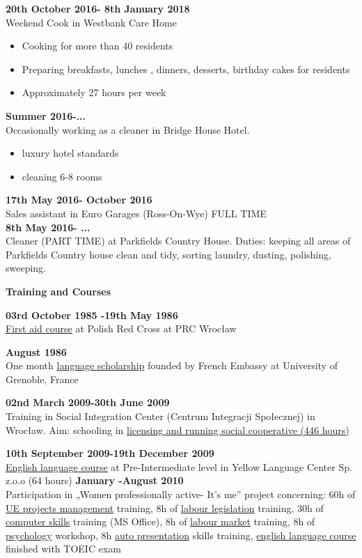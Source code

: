 \documentclass[a4paper,12pt,final]{memoir}
\newcommand{\SmallSep}{\vspace{0.5em}}
\newenvironment{Career Profile}
	{\ignorespaces\textbf{\color{ForestGreen} Career Profile}}
	{\Sep\ignorespacesafterend}
\newenvironment{Key experience}
	{\ignorespaces\textbf{\color{ForestGreen} Key experience}}
	{\Sep\ignorespacesafterend}
\newcommand{\CVSection}[1]
	{\Large\textbf{#1}\par
	\SmallSep\normalsize\normalfont}
\newcommand{\CVItem}[1]
	{\textbf{\color{ForestGreen} #1}}
\begin{document}
\CVItem{20th October 2016- 8th January 2018}\\
Weekend Cook in Westbank Care Home \\
\begin{itemize}
\item{Cooking for more than 40 residents}
\item{Preparing breakfasts, lunches , dinners, desserts, birthday cakes for residents}
\item{Approximately 27  hours per week}
\end{itemize}

\SmallSep
\clearpage
\framebreak
\framebreak

\CVItem{Summer 2016-...}\\
Occasionally working as a cleaner in Bridge House Hotel.\\
\begin{itemize}
\item{luxury hotel standards}
\item{cleaning 6-8 rooms}
\end{itemize}

\CVItem{17th May 2016- October 2016}\\
Sales assistant in Euro Garages (Ross-On-Wye) FULL TIME\\


\CVItem{8th May 2016- ...}\\
Cleaner (PART TIME) at Parkfields Country House. Duties: keeping all
areas of Parkfields Country house clean and tidy, sorting laundry, dusting,
polishing, sweeping.\\



\SmallSep

\CVSection{Training and Courses}
\CVItem{ 03rd October 1985 -19th May 1986}\\
\underline{First aid course} at Polish Red Cross at PRC Wrocław
\SmallSep

\CVItem{August 1986}\\
One month \underline{language scholarship} founded by French Embassy at University of Grenoble, France
\SmallSep

\CVItem{02nd March 2009-30th June 2009	}\\
Training in Social Integration Center (Centrum Integracji Społecznej) in 	Wrocław. Aim: schooling in \underline{licensing and running social cooperative (446 hours)}
\SmallSep

\CVItem{10th September 2009-19th December 2009}\\
\underline{English language course} at Pre-Intermediate level in Yellow Language Center 	Sp. z.o.o  (64 hours)
\SmallSep
\clearpage
\framebreak
\framebreak
\CVItem{January -August 2010 }\\
Participation in „Women professionally active- It's me” project concerning: 60h of \underline{UE projects management} training, 8h of \underline{labour legislation} training, 30h of \underline{computer skills} training (MS Office), 8h of \underline{labour market} training, 8h of \underline{psychology} workshop, 8h \underline{auto presentation} skills training,  \underline{english language course} finished with TOEIC exam
\SmallSep
\end{document}

